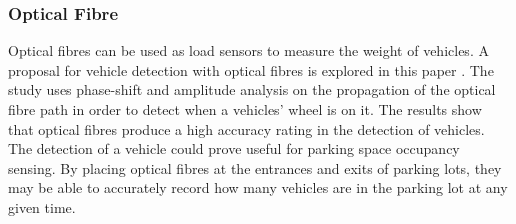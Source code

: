 \subsubsection*{Optical Fibre}
Optical fibres can be used as load sensors to measure the weight of vehicles. A proposal for vehicle detection with optical fibres is explored in this paper \citep{gupta_automated_2016}. The study uses phase-shift and amplitude analysis on the propagation of the optical fibre path in order to detect when a vehicles' wheel is on it. The results show that optical fibres produce a high accuracy rating in the detection of vehicles. The detection of a vehicle could prove useful for parking space occupancy sensing. By placing optical fibres at the entrances and exits of parking lots, they may be able to accurately record how many vehicles are in the parking lot at any given time.